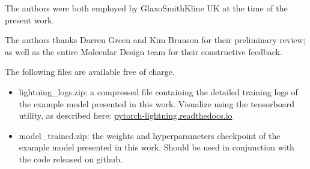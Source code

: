 \documentclass[journal=jacsat,manuscript=article]{achemso}
\begin{document}
The authors were both employed by GlaxoSmithKline UK at the time of the present work.

\begin{acknowledgement}

The authors thanks Darren Green and Kim Branson for their preliminary review; as well as the entire Molecular Design team for their constructive feedback.

\end{acknowledgement}

\begin{suppinfo}

The following files are available free of charge.
\begin{itemize}
  \item lightning\_logs.zip: a compressed file containing the detailed training logs of the example model presented in this work. Visualize using the tensorboard utility, as described here: \href{https://pytorch-lightning.readthedocs.io/en/stable/starter/introduction_guide.html}{pytorch-lightning.readthedocs.io}
  \item model_trained.zip: the weights and hyperparameters checkpoint of the example model presented in this work. Should be used in conjunction with the code released on github.
\end{itemize}

\end{suppinfo}

%

\end{document}
